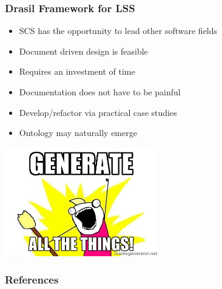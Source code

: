 \documentclass{beamer}
\begin{document}
\begin{frame}

\frametitle{Drasil Framework for LSS}

\begin{itemize}
\item SCS has the opportunity to lead other software fields%
\item Document driven design is feasible%
\item Requires an investment of time %
\item Documentation does not have to be painful
\item Develop/refactor via practical case studies
\item Ontology may naturally emerge
\end{itemize}

\includegraphics[width=0.5\textwidth]{../WG2_11/generate_all_the_things.jpg}


\end{frame}






\begin{frame}[allowframebreaks]
\frametitle{References}


\end{frame}

\end{document}
